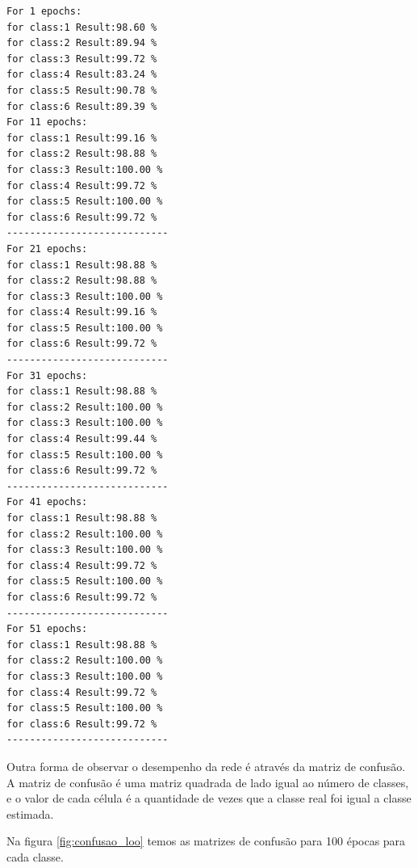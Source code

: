 \documentclass[paper=a4, fontsize=11pt]{scrartcl}
\numberwithin{equation}{section}		%
\numberwithin{figure}{section}			%
\numberwithin{table}{section}				%
\begin{document}
	\begin{multicols}{2}
    	\begin{verbatim}
For 1 epochs:
for class:1 Result:98.60 %
for class:2 Result:89.94 %
for class:3 Result:99.72 %
for class:4 Result:83.24 %
for class:5 Result:90.78 %
for class:6 Result:89.39 %
For 11 epochs:
for class:1 Result:99.16 %
for class:2 Result:98.88 %
for class:3 Result:100.00 %
for class:4 Result:99.72 %
for class:5 Result:100.00 %
for class:6 Result:99.72 %
----------------------------
For 21 epochs:
for class:1 Result:98.88 %
for class:2 Result:98.88 %
for class:3 Result:100.00 %
for class:4 Result:99.16 %
for class:5 Result:100.00 %
for class:6 Result:99.72 %
----------------------------
For 31 epochs:
for class:1 Result:98.88 %
for class:2 Result:100.00 %
for class:3 Result:100.00 %
for class:4 Result:99.44 %
for class:5 Result:100.00 %
for class:6 Result:99.72 %
----------------------------
For 41 epochs:
for class:1 Result:98.88 %
for class:2 Result:100.00 %
for class:3 Result:100.00 %
for class:4 Result:99.72 %
for class:5 Result:100.00 %
for class:6 Result:99.72 %
----------------------------
For 51 epochs:
for class:1 Result:98.88 %
for class:2 Result:100.00 %
for class:3 Result:100.00 %
for class:4 Result:99.72 %
for class:5 Result:100.00 %
for class:6 Result:99.72 %
----------------------------
    	\end{verbatim}
    \end{multicols}

    Outra forma de observar o desempenho da rede é através da matriz de confusão. A matriz de confusão é uma matriz quadrada de lado igual ao número de classes, e o valor de cada célula é a quantidade de vezes que a classe real foi igual a classe estimada.
	
	Na figura \ref{fig:confusao_loo} temos as matrizes de confusão para 100 épocas para cada classe.
	
\end{document}

